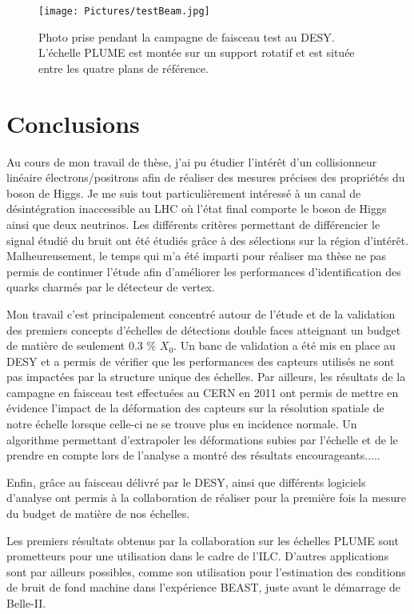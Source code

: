 \documentclass[a4papper, 10pt]{article}
\begin{document}
  \begin{figure}
    \centering
    \texttt{[image: Pictures/testBeam.jpg]}
    \caption{Photo prise pendant la campagne de faisceau test au DESY. L'échelle PLUME est montée sur un support rotatif et est située entre les quatre plans de référence.}
    \label{fig:testBeam}
  \end{figure}

  \section{Conclusions}
 
  Au cours de mon travail de thèse, j'ai pu étudier l'intérêt d'un collisionneur linéaire électrons/positrons afin de réaliser des mesures précises des propriétés du boson de Higgs.
  Je me suis tout particulièrement intéressé à un canal de désintégration inaccessible au LHC où l'état final comporte le boson de Higgs ainsi que deux neutrinos. 
  Les différents critères permettant de différencier le signal étudié du bruit ont été étudiés grâce à des sélections sur la région d'intérêt.
  Malheureusement, le temps qui m'a été imparti pour réaliser ma thèse ne pas permis de continuer l'étude afin d'améliorer les performances d'identification des quarks charmés par le détecteur de vertex.

  Mon travail c'est principalement concentré autour de l'étude et de la validation des premiers concepts d'échelles de détections double faces atteignant un budget de matière de seulement 0.3 \% $X_0$.
  Un banc de validation a été mis en place au DESY et a permis de vérifier que les performances des capteurs utilisés ne sont pas impactées par la structure unique des échelles.
  Par ailleurs, les résultats de la campagne en faisceau test effectuées au CERN en 2011 ont permis de mettre en évidence l'impact de la déformation des capteurs sur la résolution spatiale de notre échelle lorsque celle-ci ne se trouve plus en incidence normale.
  Un algorithme permettant d'extrapoler les déformations subies par l'échelle et de le prendre en compte lors de l'analyse a montré des résultats encourageants.....

  Enfin, grâce au faisceau délivré par le DESY, ainsi que différents logiciels d'analyse ont permis à la collaboration de réaliser pour la première fois la mesure du budget de matière de nos échelles.

  Les premiers résultats obtenus par la collaboration sur les échelles PLUME sont prometteurs pour une utilisation dans le cadre de l'ILC.
  D'autres applications sont par ailleurs possibles, comme son utilisation pour l'estimation des conditions de bruit de fond machine dans l'expérience BEAST, juste avant le démarrage de Belle-II.
\end{document}
